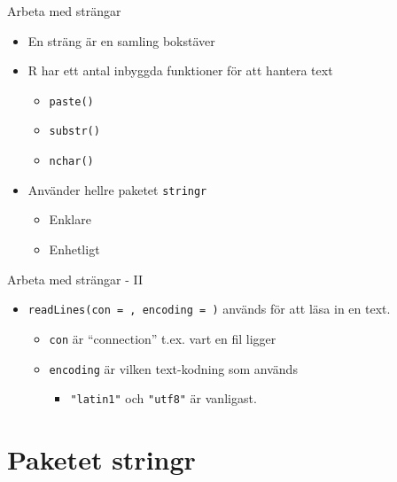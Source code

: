 \documentclass[
  10pt,
  ignorenonframetext,
  handout]{beamer}
\providecommand{\tightlist}{%
  \setlength{\itemsep}{0pt}\setlength{\parskip}{0pt}}
\begin{document}
\begin{frame}{Arbeta med strängar}
\label{arbeta-med-struxe4ngar}
\begin{itemize}
\tightlist
\item
  En sträng är en samling bokstäver
\item
  R har ett antal inbyggda funktioner för att hantera text

  \begin{itemize}
  \tightlist
  \item
    \texttt{paste()}
  \item
    \texttt{substr()}
  \item
    \texttt{nchar()}
  \end{itemize}
\item
  Använder hellre paketet \texttt{stringr}

  \begin{itemize}
  \tightlist
  \item
    Enklare
  \item
    Enhetligt
  \end{itemize}
\end{itemize}
\end{frame}

\begin{frame}{Arbeta med strängar - II}
\label{arbeta-med-struxe4ngar---ii}
\begin{itemize}
\tightlist
\item
  \texttt{readLines(con = , encoding = )} används för att läsa in en
  text.

  \begin{itemize}
  \tightlist
  \item
    \texttt{con} är ``connection'' t.ex. vart en fil ligger
  \item
    \texttt{encoding} är vilken text-kodning som används

    \begin{itemize}
    \tightlist
    \item
      \texttt{"latin1"} och \texttt{"utf8"} är vanligast.
    \end{itemize}
  \end{itemize}
\end{itemize}
\end{frame}

\section{Paketet stringr}\label{paketet-stringr}
\end{document}
